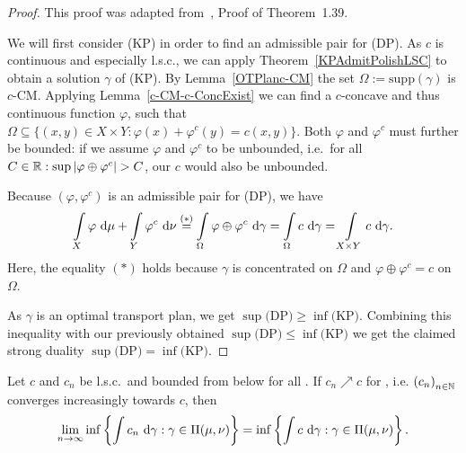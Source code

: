 \begin{proof}
	This proof was adapted from~\cite{San2015}, Proof of Theorem~1.39.

	We will first consider (KP) in order to find an admissible pair for (DP). As $c$ is continuous and especially l.s.c., we can apply Theorem~\ref{KPAdmitPolishLSC} to obtain a solution $\gamma$ of (KP). By Lemma~\ref{OTPlanc-CM} the set $\Omega := \text{supp}(\gamma)$ is $c$-CM\@. Applying Lemma~\ref{c-CM-c-ConcExist} we can find a $c$-concave and thus continuous function $\varphi$, such that $\Omega \subseteq \{ (x, y) \in X \times Y : \varphi(x) + \varphi^c(y) = c(x, y) \}$. Both $\varphi$ and $\varphi^c$ must further be bounded: if we assume $\varphi$ and $\varphi^c$ to be unbounded, i.e.~for all $C \in \R: \sup \vert \varphi \oplus \varphi^c \vert > C$, our $c$ would also be unbounded.
	
	Because $(\varphi, \varphi^c)$ is an admissible pair for (DP), we have
	\[ \int\limits_X \varphi~\D + \int\limits_Y \varphi^c~\D[\nu] \overset{(*)}{=} \int\limits_{\Omega} \varphi \oplus \varphi^c~\D[\gamma]  = \int\limits_{\Omega} c~\D[\gamma] = \int\limits_{X \times Y} c~\D[\gamma]. \]
	Here, the equality $(*)$ holds because $\gamma$ is concentrated on $\Omega$ and $\varphi \oplus \varphi^c = c$ on $\Omega$.

	As $\gamma$ is an optimal transport plan, we get $\sup \text{(DP)} \ge \inf \text{(KP)}$. Combining this inequality with our previously obtained $\sup \text{(DP)} \le \inf \text{(KP)}$ we get the claimed strong duality $\sup \text{(DP)} = \inf \text{(KP)}$.
\end{proof}


\begin{lemma}\label{ConvOfKanProb}
	Let $c$ and $c_n$ be l.s.c.\ and bounded from below for all \NinN. If $c_n \nearrow c$ for \Ninf, i.e. ${(c_n)}_{\NinN}$ converges increasingly towards $c$, then
	\[ \lim\limits_{\Ninf} \inf \left\{ \int c_n~\D[\gamma] : \gamma \in \TP{\mu}{\nu} \right\} = \inf \left\{ \int c~\D[\gamma] : \gamma \in \TP{\mu}{\nu} \right\}. \]
\end{lemma}

